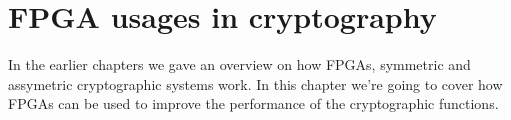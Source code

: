 \chapter{FPGA usages in cryptography\label{FPGA_crypto}}
In the earlier chapters we gave an overview on how FPGAs, symmetric and
assymetric cryptographic systems work. In this chapter we're going to cover how
FPGAs can be used to improve the performance of the cryptographic functions.
